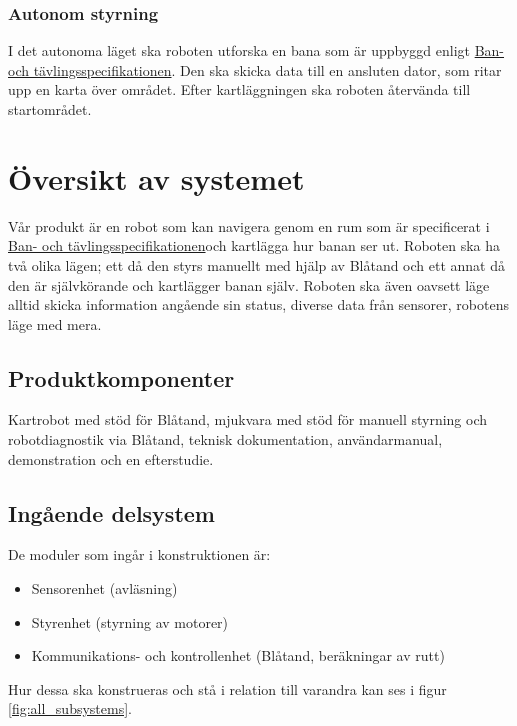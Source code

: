 \documentclass[a4paper,11pt]{article}
\newcommand{\CourseSpecUrl}{https://docs.google.com/document/d/1hnHsI6WGyKorMat25x1FAQ9RA_gEzG-Wgb9o5-Dw_AI/edit?usp=sharing}
\newcommand{\CourseSpecRef}{\href{\CourseSpecUrl}{Ban- och tävlingsspecifikationen}}
\begin{document}
\subsubsection{Autonom styrning}
I det autonoma läget ska roboten utforska en bana som är uppbyggd enligt \CourseSpecRef. Den ska skicka data till en ansluten dator, som ritar upp en karta över området. Efter kartläggningen ska roboten återvända till startområdet. 

\section{Översikt av systemet}
Vår produkt är en robot som kan navigera genom en rum som är specificerat i \CourseSpecRef och kartlägga hur banan ser ut. Roboten ska ha två olika lägen; ett då den styrs manuellt med hjälp av Blåtand och ett annat då den är självkörande och kartlägger banan själv. Roboten ska även oavsett läge alltid skicka information angående sin status, diverse data från sensorer, robotens läge med mera. 

\subsection{Produktkomponenter}
Kartrobot med stöd för Blåtand, mjukvara med stöd för manuell styrning och robotdiagnostik via Blåtand, teknisk dokumentation, användarmanual, demonstration och en efterstudie. 

\subsection{Ingående delsystem}
De moduler som ingår i konstruktionen är:
\begin{itemize}
    \item Sensorenhet (avläsning) 
    \item Styrenhet (styrning av motorer) 
    \item Kommunikations- och kontrollenhet (Blåtand, beräkningar av rutt) 
\end{itemize}
Hur dessa ska konstrueras och stå i relation till varandra kan ses i figur \ref{fig:all_subsystems}.

\newpage
\end{document}
